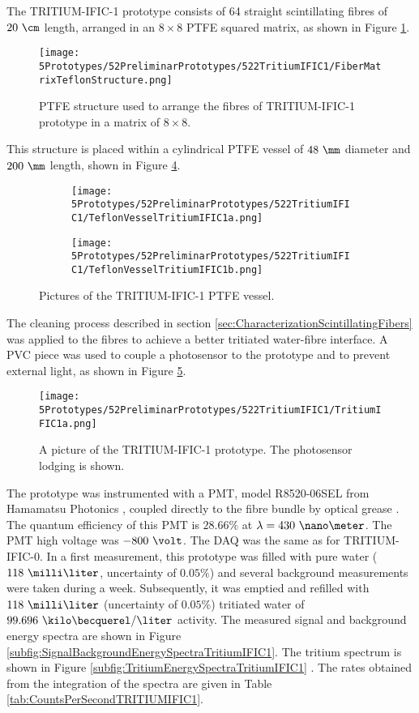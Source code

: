 The TRITIUM-IFIC-1 prototype consists of 64 straight scintillating fibres of $20~\cm$ length, arranged in an $8\times 8$ PTFE squared matrix, as shown in Figure \ref{fig:TeflonStructureFibersTritiumIFIC1}.
\begin{figure}[h]
\centering
\texttt{[image: 5Prototypes/52PreliminarPrototypes/522TritiumIFIC1/FiberMatrixTeflonStructure.png]}
\caption{PTFE structure used to arrange the fibres of TRITIUM-IFIC-1 prototype in a matrix of $8 \times 8$.\label{fig:TeflonStructureFibersTritiumIFIC1}}
\end{figure}
This structure is placed within a cylindrical PTFE vessel of $48~\mm$ diameter and $200~\mm$ length, shown in Figure \ref{fig:TeflonVesselTritumIFIC1}. 
\begin{figure}
\centering
    \begin{subfigure}[b]{0.30\textwidth}
    \centering
    \texttt{[image: 5Prototypes/52PreliminarPrototypes/522TritiumIFIC1/TeflonVesselTritiumIFIC1a.png]}  
    \caption{\label{subfig:TeflonVesselTritumIFIC1a}}
    \end{subfigure}
    \hfill
    \begin{subfigure}[b]{0.45\textwidth}
    \centering
    \texttt{[image: 5Prototypes/52PreliminarPrototypes/522TritiumIFIC1/TeflonVesselTritiumIFIC1b.png]}  
    \caption{\label{subfig:TeflonVesselTritumIFIC1b}}
    \end{subfigure}
 \caption{Pictures of the TRITIUM-IFIC-1 PTFE vessel.}
 \label{fig:TeflonVesselTritumIFIC1}
\end{figure}
The cleaning process described in section \ref{sec:CharacterizationScintillatingFibers} was applied to the fibres to achieve a better tritiated water-fibre interface. A PVC piece was used to couple a photosensor to the prototype and to prevent external light, as shown in Figure \ref{fig:TritumIFIC1}. 
\begin{figure}[h]
\centering
\texttt{[image: 5Prototypes/52PreliminarPrototypes/522TritiumIFIC1/TritiumIFIC1a.png]}
\caption{A picture of the TRITIUM-IFIC-1 prototype. The photosensor lodging is shown.\label{fig:TritumIFIC1}}
\end{figure}
The prototype was instrumented with a PMT, model R8520-06SEL from Hamamatsu Photonics \cite{DataSheetPMTs}, coupled directly to the fibre bundle by optical grease \cite{OpticalGrease}. The quantum efficiency of this PMT is $28.66\%$ at $\lambda=430~\nano\meter$.  The PMT high voltage was $-800~\volt$. The DAQ was the same as for TRITIUM-IFIC-0. In a first measurement, this prototype was filled with pure water ($118~\milli\liter$, uncertainty of $0.05\%$) and several background measurements were taken during a week. Subsequently, it was emptied and refilled with $118~\milli\liter$ (uncertainty of $0.05\%$) tritiated water of $99.696~\kilo\becquerel/\liter$ activity. The measured signal and background energy spectra are shown in Figure \ref{subfig:SignalBackgroundEnergySpectraTritiumIFIC1}. The tritium spectrum is shown in Figure \ref{subfig:TritiumEnergySpectraTritiumIFIC1} \cite{SidneyNadia, SloveniaMarcos}. The rates obtained from the integration of the spectra are given in Table \ref{tab:CountsPerSecondTRITIUMIFIC1}. 

